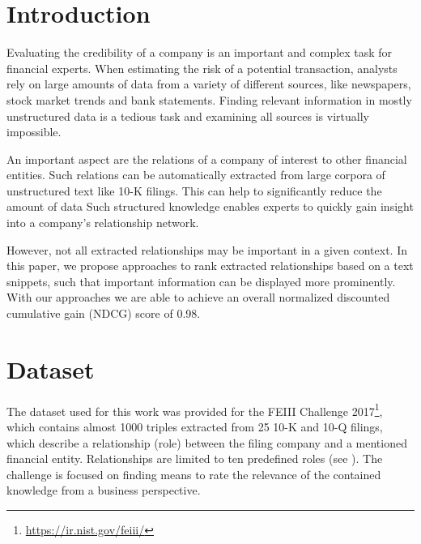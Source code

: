 \section{Introduction}

Evaluating the credibility of a company is an important and complex task for financial experts.
When estimating the risk of a potential transaction, analysts rely on large amounts of data from a variety of different sources, like newspapers, stock market trends and bank statements.
Finding relevant information in mostly unstructured data is a tedious task and examining all sources is virtually impossible.

An important aspect are the relations of a company of interest to other financial entities.
Such relations can be automatically extracted from large corpora of unstructured text\cite{entityextraction} like 10-K filings.
This can help to significantly reduce the amount of data
Such structured knowledge enables experts to quickly gain insight into a company's relationship network.

However, not all extracted relationships may be important in a given context.
In this paper, we propose approaches to rank extracted relationships based on a text snippets, such that important information can be displayed more prominently.
With our approaches we are able to achieve an overall normalized discounted cumulative gain (NDCG) score of 0.98.

\section{Dataset}
The dataset used for this work was provided for the FEIII Challenge 2017\footnote{\url{https://ir.nist.gov/feiii/}}, which contains almost 1000 triples extracted from 25 10-K and 10-Q filings, which describe a relationship (role) between the filing company and a mentioned financial entity.
Relationships are limited to ten predefined roles (see ).
The challenge is focused on finding means to rate the relevance of the contained knowledge from a business perspective.

